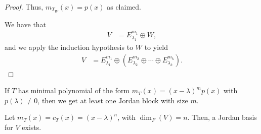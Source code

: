 \documentclass[10pt]{mypackage}
\begin{document}
\begin{proof}
  Thus, $m_{T_W}(x) = p(x)$ as claimed.\newline

  We have that
  \begin{align*}
    V &= E_{\lambda_1}^{m_1}\oplus W,
  \end{align*}
  and we apply the induction hypothesis to $W$ to yield
  \begin{align*}
    V &= E_{\lambda_1}^{m_1}\oplus \left(E_{\lambda_2}^{m_2}\oplus \cdots \oplus E_{\lambda_k}^{m_k}\right).
  \end{align*}
\end{proof}
If $T$ has minimal polynomial of the form $m_T(x) = \left(x-\lambda\right)^mp(x)$ with $p\left(\lambda\right) \neq 0$, then we get at least one Jordan block with size $m$.
\begin{lemma}
  Let $m_T(x) = c_T(x) = \left(x-\lambda\right)^n$, with $\dim_{F}\left(V\right) = n$. Then, a Jordan basis for $V$ exists.
\end{lemma}
\end{document}
